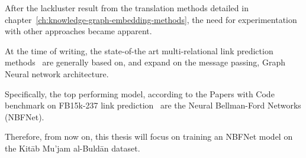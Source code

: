 After the lackluster result from the translation methods detailed in chapter~\ref{ch:knowledge-graph-embedding-methods}, the need for
experimentation with other approaches became apparent.

At the time of writing, the state-of-the art multi-relational link prediction methods~\cite{LPSOTA} are generally
based on, and expand on the message passing, Graph Neural network architecture.

Specifically, the top performing model, according to the Papers with Code benchmark on FB15k-237 link prediction~\cite{NBFNetSota}
are the Neural Bellman-Ford Networks (NBFNet).

Therefore, from now on, this thesis will focus on training an NBFNet model on the Kitāb Mu'jam al-Buldān dataset.
